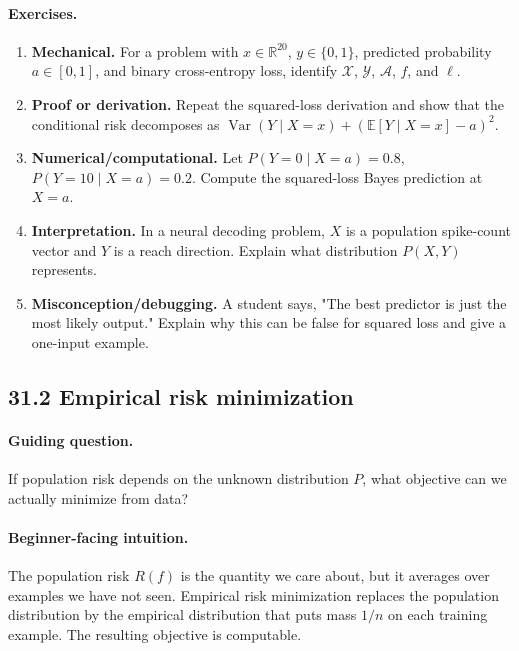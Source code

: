 \paragraph{Exercises.}
\begin{enumerate}[label=\textbf{31.1.\arabic*.}, leftmargin=*]
\item \textbf{Mechanical.} For a problem with \(x\in\mathbb R^{20}\), \(y\in\{0,1\}\), predicted probability \(a\in[0,1]\), and binary cross-entropy loss, identify \(\mathcal X\), \(\mathcal Y\), \(\mathcal A\), \(f\), and \(\ell\).
\item \textbf{Proof or derivation.} Repeat the squared-loss derivation and show that the conditional risk decomposes as \(\operatorname{Var}(Y\mid X=x)+(\mathbb E[Y\mid X=x]-a)^2\).
\item \textbf{Numerical/computational.} Let \(P(Y=0\mid X=a)=0.8\), \(P(Y=10\mid X=a)=0.2\). Compute the squared-loss Bayes prediction at \(X=a\).
\item \textbf{Interpretation.} In a neural decoding problem, \(X\) is a population spike-count vector and \(Y\) is a reach direction. Explain what distribution \(P(X,Y)\) represents.
\item \textbf{Misconception/debugging.} A student says, "The best predictor is just the most likely output." Explain why this can be false for squared loss and give a one-input example.
\end{enumerate}

\subsection{31.2 Empirical risk minimization}

\paragraph{Guiding question.}
If population risk depends on the unknown distribution \(P\), what objective can we actually minimize from data?

\paragraph{Beginner-facing intuition.}
The population risk \(R(f)\) is the quantity we care about, but it averages over examples we have not seen. Empirical risk minimization replaces the population distribution by the empirical distribution that puts mass \(1/n\) on each training example. The resulting objective is computable.

